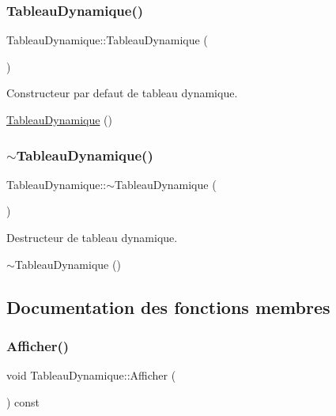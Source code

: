 \subsubsection{\texorpdfstring{Tableau\+Dynamique()}{TableauDynamique()}}
{\footnotesize\ttfamily Tableau\+Dynamique\+::\+Tableau\+Dynamique (\begin{DoxyParamCaption}{ }\end{DoxyParamCaption})}



Constructeur par defaut de tableau dynamique. 

\hyperlink{classTableauDynamique}{Tableau\+Dynamique} () \mbox{\label{classTableauDynamique_a0aa7eed220cb6a78eb6ea661df42867b}} 
\subsubsection{\texorpdfstring{$\sim$\+Tableau\+Dynamique()}{~TableauDynamique()}}
{\footnotesize\ttfamily Tableau\+Dynamique\+::$\sim$\+Tableau\+Dynamique (\begin{DoxyParamCaption}{ }\end{DoxyParamCaption})}



Destructeur de tableau dynamique. 

$\sim$\+Tableau\+Dynamique () 

\subsection{Documentation des fonctions membres}
\mbox{\label{classTableauDynamique_ae1cd223289dc0ab3c8a388c7da7b5ca5}} 
\subsubsection{\texorpdfstring{Afficher()}{Afficher()}}
{\footnotesize\ttfamily void Tableau\+Dynamique\+::\+Afficher (\begin{DoxyParamCaption}{ }\end{DoxyParamCaption}) const}



